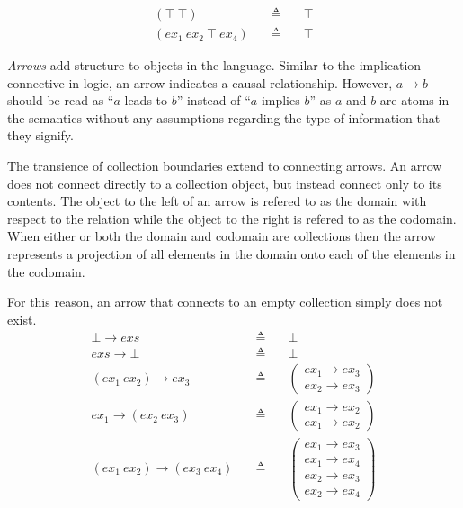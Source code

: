 \documentclass[a4paper,11pt]{article}
\begin{document}
\begin{eqnarray*}
(\top\ \top) \quad&\triangleq&\quad \top \\
(ex_1\ ex_2\ \top\ ex_4) \quad&\triangleq&\quad \top
\end{eqnarray*}

\emph{Arrows} add structure to objects in the language.
Similar to the implication connective in logic, an arrow indicates a causal relationship.
However, $a \rightarrow b$ should be read as ``$a$ leads to $b$'' instead of ``$a$ implies $b$'' as $a$ and $b$ are atoms in the semantics without any assumptions regarding the type of information that they signify.

The transience of collection boundaries extend to connecting arrows.
An arrow does not connect directly to a collection object, but instead connect only to its contents.
The object to the left of an arrow is refered to as the domain with respect to the relation while the object to the right is refered to as the codomain.
When either or both the domain and codomain are collections then the arrow represents a projection of all elements in the domain onto each of the elements in the codomain.

For this reason, an arrow that connects to an empty collection simply does not exist.
\begin{eqnarray*}
\bot \rightarrow exs \quad&\triangleq&\quad \bot \\
exs \rightarrow \bot \quad&\triangleq&\quad \bot \\
(ex_1\ ex_2) \rightarrow ex_3 \quad&\triangleq&\quad \left(
  \begin{array}{c}
    ex_1 \rightarrow ex_3 \\
    ex_2 \rightarrow ex_3
  \end{array}\right) \\
ex_1 \rightarrow (ex_2\ ex_3) \quad&\triangleq&\quad \left(
  \begin{array}{c}
    ex_1 \rightarrow ex_2 \\
    ex_1 \rightarrow ex_2
  \end{array}\right) \\
(ex_1\ ex_2) \rightarrow (ex_3\ ex_4) \quad&\triangleq&\quad \left(
  \begin{array}{c}
    ex_1 \rightarrow ex_3 \\
    ex_1 \rightarrow ex_4 \\
    ex_2 \rightarrow ex_3 \\
    ex_2 \rightarrow ex_4
  \end{array}\right)
\end{eqnarray*}
\end{document}
